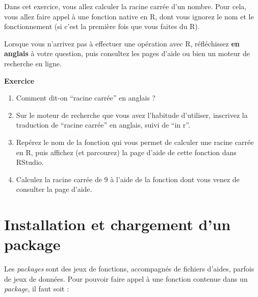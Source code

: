 \documentclass[
  11pt,
]{book}
\newcommand{\VERB}{\Verb[commandchars=\\\{\}]}
\newcommand{\FunctionTok}[1]{\textcolor[rgb]{0.13,0.29,0.53}{\textbf{#1}}}
\newcommand{\NormalTok}[1]{#1}
\newcommand{\SpecialCharTok}[1]{\textcolor[rgb]{0.81,0.36,0.00}{\textbf{#1}}}
\newcommand{\StringTok}[1]{\textcolor[rgb]{0.31,0.60,0.02}{#1}}
\providecommand{\tightlist}{%
  \setlength{\itemsep}{0pt}\setlength{\parskip}{0pt}}
\numberwithin{equation}{section}
\numberwithin{countremarque}{section}
\newenvironment{notebox}{
  \begin{tcolorbox}[breakable, colback=jaune,coltext=black,
                  colframe=grisfonce]}
 {\end{tcolorbox}}
\newenvironment{greenbox}{
  \begin{tcolorbox}[breakable, colback=vert,coltext=black,
                  colframe=grisfonce]}
 {\end{tcolorbox}}
\begin{document}
Dans cet exercice, vous allez calculer la racine carrée d'un nombre. Pour cela, vous allez faire appel à une fonction native en R, dont vous ignorez le nom et le fonctionnement (si c'est la première fois que vous faites du R).

\begin{notebox}
Lorsque vous n'arrivez pas à effectuer une opération avec R, réfléchissez \textbf{en anglais} à votre question, puis consultez les pages d'aide ou bien un moteur de recherche en ligne.

\end{notebox}

\begin{greenbox}

\textbf{Exercice}

\begin{enumerate}
\def\labelenumi{\arabic{enumi}.}
\tightlist
\item
  Comment dit-on ``racine carrée'' en anglais ?
\item
  Sur le moteur de recherche que vous avez l'habitude d'utiliser, inscrivez la traduction de ``racine carrée'' en anglais, suivi de ``in r''.
\item
  Repérez le nom de la fonction qui vous permet de calculer une racine carrée en R, puis affichez (et parcourez) la page d'aide de cette fonction dans RStudio.
\item
  Calculez la racine carrée de 9 à l'aide de la fonction dont vous venez de consulter la page d'aide.
\end{enumerate}

\end{greenbox}

\hypertarget{installation-et-chargement-dun-package}{%
\section{Installation et chargement d'un package}\label{installation-et-chargement-dun-package}}

Les \emph{packages} sont des jeux de fonctions, accompagnés de fichiers d'aides, parfois de jeux de données. Pour pouvoir faire appel à une fonction contenue dans un \emph{package}, il faut soit :

\end{document}
